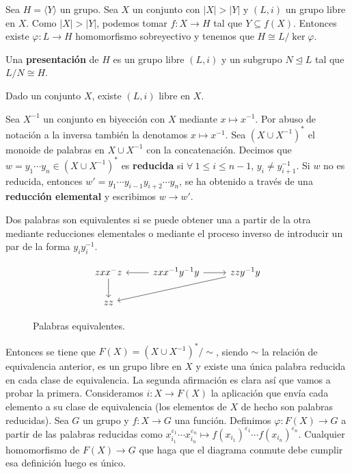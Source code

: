 \documentclass[bibtex, anon]{TEMat-article}
\providecommand{\gene}[1]{\langle{#1}\rangle}
\begin{document}
\begin{observacion}\label{4.2}
	Sea $H=\gene{Y}$ un grupo. Sea $X$ un conjunto con $|X|>|Y|$ y $(L,i)$ un grupo libre en $X$. Como $|X|>|Y|$, podemos tomar $f:X\to H$ tal que $Y\subseteq f(X)$. Entonces existe $\varphi:L\to H$ homomorfismo sobreyectivo y tenemos que $H\cong L/\ker\varphi$.
\end{observacion}

\begin{definicion}
	Una \textbf{presentación} de $H$ es un grupo libre $(L,i)$ y un subgrupo $N\trianglelefteq L$ tal que $L/N\cong H$. 
\end{definicion}

\begin{teorema}
	Dado un conjunto $X$, existe $(L,i)$ libre en $X$. %
\end{teorema}
\begin{demostracion}
	Sea $X^{-1}$ un conjunto en biyección con $X$ mediante $x\mapsto x^{-1}$. Por abuso de notación a la inversa también la denotamos $x\mapsto x^{-1}$. Sea $(X\cup X^{-1})^*$ el monoide de palabras en $X\cup X^{-1}$ con la concatenación. Decimos que $w=y_1\cdots y_n\in (X\cup X^{-1})^*$ es \textbf{reducida} si $\forall\ 1\leq i\leq n-1$, $y_i\neq y_{i+1}^{-1}$. Si $w$ no es reducida, entonces $w'=y_1\cdots y_{i-1}y_{i+2}\cdots y_n$, se ha obtenido a través de una \textbf{reducción elemental} y escribimos $w\to w'$. 
	
	Dos palabras son equivalentes si se puede obtener una a partir de la otra mediante reducciones elementales o mediante el proceso inverso de introducir un par de la forma $y_iy_i^{-1}$.
	\begin{figure}[h!]
	\[
	\begin{tikzcd}
	zxx^{-}z\arrow[d] & zxx^{-1}y^{-1}y\arrow[l]\arrow[r] &zzy^{-1}y\arrow[lld]\\
	zz 
	\end{tikzcd}
	\]
	\caption{Palabras equivalentes.}
		\end{figure}
	
	Entonces se tiene que $F(X)=(X\cup X^{-1})^*/\sim$, siendo $\sim$ la relación de equivalencia anterior, es un grupo libre en $X$ y existe una única palabra reducida en cada clase de equivalencia. La segunda afirmación es clara así que vamos a probar la primera. Consideramos $i:X\to F(X)$ la aplicación que envía cada elemento a su clase de equivalencia (los elementos de $X$ de hecho son palabras reducidas). Sea $G$ un grupo y $f:X\to G$ una función. Definimos $\varphi:F(X)\to G$ a partir de las palabras reducidas como $x_{i_1}^{\varepsilon_1}\cdots x_{i_n}^{\varepsilon_n}\mapsto f(x_{i_1})^{\varepsilon_1}\cdots f(x_{i_n})^{\varepsilon_n}$. Cualquier homomorfismo de $F(X)\to G$ que haga que el diagrama conmute debe cumplir esa definición luego es único. %
	
\end{demostracion}
\end{document}

